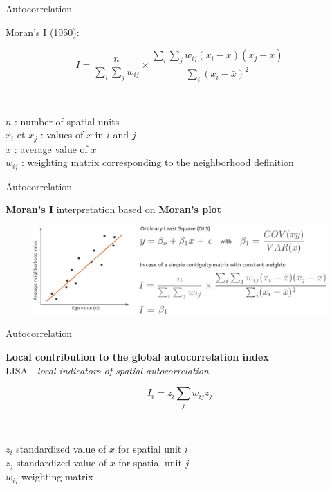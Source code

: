 \begin{frame}{Autocorrelation}

Moran's I (1950):

$$
I = \frac{n}{\sum_{i} \sum_{j} w_{ij}} \times \frac{\sum_{i} \sum_{j} w_{ij} (x_i - \bar{x})(x_j - \bar{x})}{\sum_{i} (x_i - \bar{x})^2}
$$

~

$n$ : number of spatial units \\ 
$x_i$ et $x_j$ : values of $x$ in $i$ and $j$ \\ 
$\bar{x}$ : average value of $x$ \\ 
$w_{ij}$ : weighting matrix corresponding to the neighborhood definition

\end{frame}



\begin{frame}{Autocorrelation}

\textbf{Moran's I} interpretation based on \textbf{Moran's plot}

\begin{figure}
\includegraphics[width=12cm]{MoranPlot.pdf}
\end{figure}

\end{frame}


\begin{frame}{Autocorrelation}

\textbf{Local contribution to the global autocorrelation index} \\
LISA - \emph{local indicators of spatial autocorrelation}

$$
I_i = z_i \sum_{j} w_{ij} z_j
$$

~

$z_i$ standardized value of $x$ for spatial unit $i$ \\
$z_j$ standardized value of $x$ for spatial unit $j$ \\
$w_{ij}$ weighting matrix

\end{frame}


